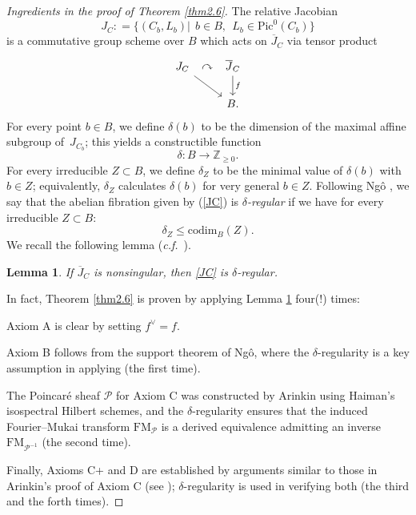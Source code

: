 \documentclass[11pt]{amsart}
\theoremstyle{plain}
\newtheorem{lem}[thm]{Lemma}
\theoremstyle{definition}
\theoremstyle{remark}
\newcommand{\BZ}{{\mathbb{Z}}}
\newcommand{\CP}{{\mathcal P}}
\begin{document}
\begin{proof}[Ingredients in the proof of Theorem \ref{thm2.6}]
The relative Jacobian 
\[
J_C: = \{(C_b, L_b)|~~ b\in B, ~~ L_b \in \mathrm{Pic}^0(C_b) \}
\]
is a commutative group scheme over $B$ which acts on $\overline{J}_C$ via tensor product
\begin{equation}\label{JC}
\begin{tikzcd}
J_C \arrow[dr] 
\arrow[r, phantom, "\;\curvearrowright\;"] 
& \overline{J}_C \arrow[d, "f"] \\
& B.
\end{tikzcd}
\end{equation}
For every point $b \in B$, we define $\delta(b)$ to be the dimension of the maximal affine subgroup of~$J_{C_b}$; this yields a constructible function
\[
\delta: B \to \BZ_{\geq 0}.
\]
For every irreducible $Z \subset B$, we define $\delta_Z$ to be the minimal value of $\delta(b)$ with $b\in Z$; equivalently, $\delta_Z$ calculates $\delta(b)$ for very general $b \in Z$. Following Ng\^o \cite{Ngo}, we say that the abelian fibration given by (\ref{JC}) is \emph{${\delta}$-regular} if we have for every irreducible $Z \subset B$:
\[
\delta_Z \leq \mathrm{codim}_B(Z).
\]
We recall the following lemma (\emph{c.f.}~\cite[Lemma 4.1]{MS_chi}).

\begin{lem}\label{lem2.7}
If $\overline{J}_C$ is nonsingular, then \eqref{JC} is $\delta$-regular.
\end{lem}


In fact, Theorem \ref{thm2.6} is proven by applying Lemma \ref{lem2.7} four(!) times:

Axiom A is clear by setting $f^\vee = f$. 


Axiom B follows from the support theorem of Ng\^o, where the $\delta$-regularity is a key assumption in applying \cite{Ngo} (the first time). 


The Poincar\'e sheaf $\CP$ for Axiom C was constructed by Arinkin \cite{A2} using Haiman's isospectral Hilbert schemes, and the $\delta$-regularity ensures that the induced Fourier--Mukai transform $\mathrm{FM}_\CP$ is a derived equivalence admitting an inverse $\mathrm{FM}_{\CP^{-1}}$ (the second time). 


Finally, Axioms C+ and D are established by arguments similar to those in Arinkin’s proof of Axiom C \cite{A2} (see \cite[Sections 3.3 and 3.5]{MSY}); $\delta$-regularity is used in verifying both (the third and the forth times).
\end{proof}
\end{document}
